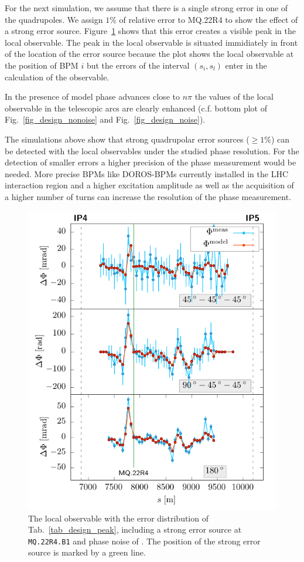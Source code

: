 For the next simulation, we assume that there is a single strong error in one of the quadrupoles. We
assign $1\%$ of relative error to MQ.22R4 to show the effect of a strong error source. Figure~\ref{fig_peak_noise}
shows that this error creates a visible peak in the local observable.
The peak in the local observable is situated immidiately in front of the location of the error source
because the plot shows the local observable at the position of BPM $i$ but the errors of the interval
$(s_i, s_l)$ enter in the calculation of the observable.

In the presence of model phase advances close to $n\pi$ the values of the local observable in the
telescopic arcs are clearly enhanced (c.f. bottom plot of Fig.~\ref{fig_design_nonoise} and
Fig.~\ref{fig_design_noise}).

The simulations above show that strong quadrupolar error sources ($\geq 1\%$) can be detected with the local
observables under the studied phase resolution.
For the detection of smaller errors a higher precision of the phase measurement would be needed.
More precise BPMs like DOROS-BPMs \cite{Gasior2011} currently installed in the LHC interaction region and a higher excitation
amplitude as well as the acquisition of a higher number of turns
can increase the resolution of the phase measurement. 
%
\begin{figure}
  \centering
\includegraphics[width=.7\linewidth]{sim_peak}
\caption{The local observable with the error distribution of Tab.~\ref{tab_design_peak}, including
    a strong error source at \texttt{MQ.22R4.B1} and phase
    noise of \noiserms.
    The position of the strong error source is marked by a green line.
  }
  \label{fig_peak_noise}
\end{figure}
%
